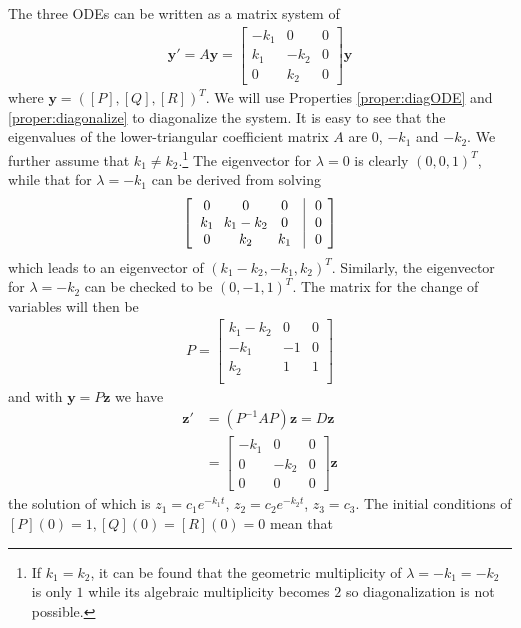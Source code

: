 \begin{solution}
The three ODEs can be written as a matrix system of
\begin{align*}
\textbf{y}'
= A\textbf{y} =
\begin{bmatrix}
-k_1 & 0 & 0 \\
k_1 & -k_2 & 0 \\
0 & k_2 & 0 
\end{bmatrix}
\textbf{y}
\end{align*}
where $\textbf{y} = ([P], [Q], [R])^T$. We will use Properties \ref{proper:diagODE} and \ref{proper:diagonalize} to diagonalize the system. It is easy to see that the eigenvalues of the lower-triangular coefficient matrix $A$ are $0$, $-k_1$ and $-k_2$. We further assume that $k_1 \neq k_2$.\footnote{If $k_1 = k_2$, it can be found that the geometric multiplicity of $\lambda = -k_1 = -k_2$ is only $1$ while its algebraic multiplicity becomes $2$ so diagonalization is not possible.} The eigenvector for $\lambda = 0$ is clearly $(0,0,1)^T$, while that for $\lambda = -k_1$ can be derived from solving
\begin{align*}
\left[\begin{array}{@{\,}wc{18pt}wc{18pt}wc{18pt}|wc{10pt}@{\,}}
0 & 0 & 0 & 0 \\
k_1 & k_1-k_2 & 0 & 0 \\
0 & k_2 & k_1 & 0
\end{array}\right]    
\end{align*}
which leads to an eigenvector of $(k_1-k_2,-k_1,k_2)^T$. Similarly, the eigenvector for $\lambda = -k_2$ can be checked to be $(0,-1,1)^T$. The matrix for the change of variables will then be
\begin{align*}
P = 
\begin{bmatrix}
k_1-k_2 & 0 & 0\\
-k_1 & -1 & 0\\
k_2 & 1 & 1\\
\end{bmatrix}
\end{align*}
and with $\textbf{y} = P\textbf{z}$ we have
\begin{align*}
\textbf{z}' &= (P^{-1}AP)\textbf{z} = D\textbf{z}\\
&= 
\begin{bmatrix}
-k_1 & 0 & 0 \\
0 & -k_2 & 0 \\
0 & 0 & 0
\end{bmatrix}\textbf{z}
\end{align*}
the solution of which is $z_1 = c_1e^{-k_1t}$, $z_2 = c_2e^{-k_2t}$, $z_3 = c_3$. The initial conditions of $[P](0) = 1, [Q](0) = [R](0) = 0$ mean that

\end{solution}
